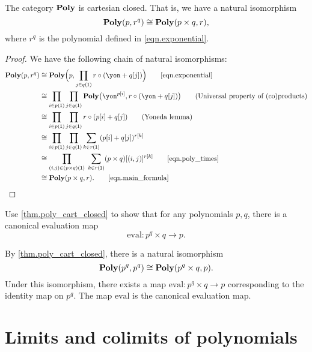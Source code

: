 \documentclass[Book-Poly]{subfiles}
\begin{document}
\begin{theorem}\label{thm.poly_cart_closed}
The category $\mathbf{Poly}$ is cartesian closed. That is, we have a natural isomorphism
\[
    \mathbf{Poly}(p,r^q) \cong \mathbf{Poly}(p\times q,r),
\]
where $r^q$ is the polynomial defined in \eqref{eqn.exponential}.
\end{theorem}
\begin{proof}
We have the following chain of natural isomorphisms:
\begin{align*}
	\poly(p, r^q) &\iso
	\poly\Big(p, \prod_{j \in q(\1)} r \circ (\yon+q[j])\Big)
	\tag*{\eqref{eqn.exponential}} \\
	&\iso
	\prod_{i\in p(\1)}\prod_{j\in q(\1)}\poly\big(\yon^{p[i]},r\circ(\yon+q[j])\big)
	\tag{Universal property of (co)products} \\
	&\iso
	\prod_{i\in p(\1)}\prod_{j\in q(\1)}r\circ(p[i]+q[j])
	\tag{Yoneda lemma} \\
	&\iso
	\prod_{i\in p(\1)}\prod_{j\in q(\1)}\sum_{k\in r(\1)}(p[i]+q[j])^{r[k]}
	\\
	&\iso
	\prod_{(i,j) \in (p \times q)(\1)} \; \sum_{k\in r(\1)}(p \times q)[(i, j)]^{r[k]}
	\tag*{\eqref{eqn.poly_times}} \\
	&\iso
	\poly(p \times q,r).
	\tag*{\eqref{eqn.main_formula}}
\end{align*}
\end{proof}

\begin{exercise}
Use \cref{thm.poly_cart_closed} to show that for any polynomials $p,q$, there is a canonical evaluation map
\begin{equation*}%
	\text{eval}\colon p^q \times q \to p.
\end{equation*}
\begin{solution}
By \cref{thm.poly_cart_closed}, there is a natural isomorphism
\[
    \mathbf{Poly}(p^q, p^q) \cong \mathbf{Poly}(p^q \times q, p).
\]
Under this isomorphism, there exists a map $\text{eval} \colon p^q \times q \to p$ corresponding to the identity map on $p^q$.
The map $\text{eval}$ is the canonical evaluation map.
\end{solution}
\end{exercise}


\section{Limits and colimits of polynomials}
\end{document}
